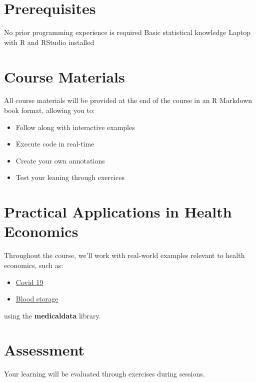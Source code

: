 \documentclass[
]{book}
\providecommand{\tightlist}{%
  \setlength{\itemsep}{0pt}\setlength{\parskip}{0pt}}
\begin{document}
\section{Prerequisites}\label{prerequisites}

No prior programming experience is required
Basic statistical knowledge
Laptop with R and RStudio installed

\section{Course Materials}\label{course-materials}

All course materials will be provided at the end of the course in an R Markdown book format, allowing you to:

\begin{itemize}
\tightlist
\item
  Follow along with interactive examples
\item
  Execute code in real-time
\item
  Create your own annotations
\item
  Test your leaning through exercices
\end{itemize}

\section{Practical Applications in Health Economics}\label{practical-applications-in-health-economics}

Throughout the course, we'll work with real-world examples relevant to health economics, such as:

\begin{itemize}
\tightlist
\item
  \href{https://htmlpreview.github.io/?https://github.com/higgi13425/medicaldata/blob/master/man/description_docs/covid_desc.html}{Covid 19}
\item
  \href{https://www.causeweb.org/tshs/datasets/Blood\%20Storage\%20Data\%20Dictionary.pdf}{Blood storage}
\end{itemize}

using the \textbf{medicaldata} library.

\section{Assessment}\label{assessment}

Your learning will be evaluated through exercises during sessions.
\end{document}
